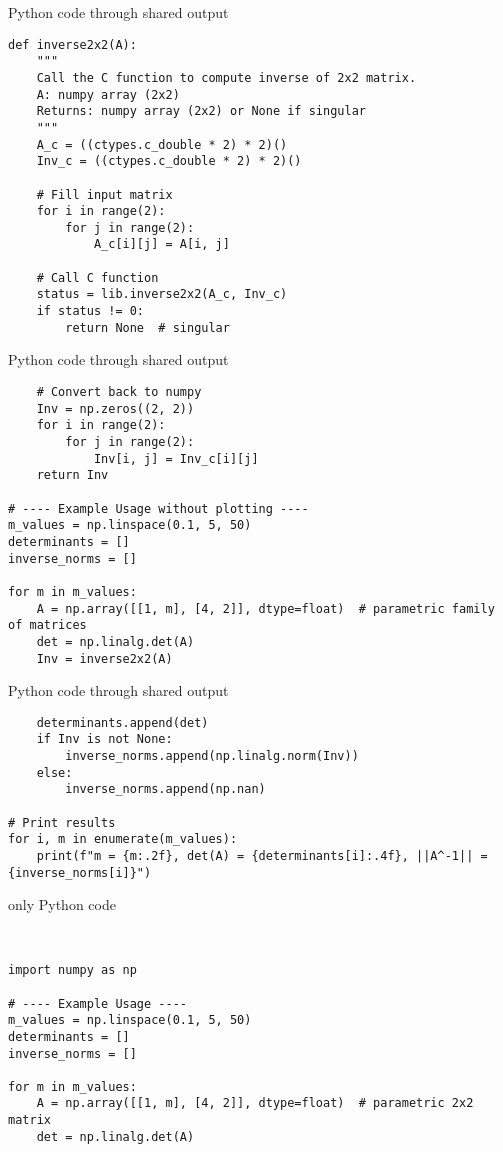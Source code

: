 \documentclass{beamer}
\begin{document}
\begin{frame}[fragile]{Python code through shared output}
\begin{lstlisting}
def inverse2x2(A):
    """
    Call the C function to compute inverse of 2x2 matrix.
    A: numpy array (2x2)
    Returns: numpy array (2x2) or None if singular
    """
    A_c = ((ctypes.c_double * 2) * 2)()
    Inv_c = ((ctypes.c_double * 2) * 2)()

    # Fill input matrix
    for i in range(2):
        for j in range(2):
            A_c[i][j] = A[i, j]

    # Call C function
    status = lib.inverse2x2(A_c, Inv_c)
    if status != 0:
        return None  # singular
 \end{lstlisting}
\end{frame}
\begin{frame}[fragile]{Python code through shared output}
\begin{lstlisting}
    # Convert back to numpy
    Inv = np.zeros((2, 2))
    for i in range(2):
        for j in range(2):
            Inv[i, j] = Inv_c[i][j]
    return Inv

# ---- Example Usage without plotting ----
m_values = np.linspace(0.1, 5, 50)
determinants = []
inverse_norms = []

for m in m_values:
    A = np.array([[1, m], [4, 2]], dtype=float)  # parametric family of matrices
    det = np.linalg.det(A)
    Inv = inverse2x2(A)
 \end{lstlisting}
\end{frame}
\begin{frame}[fragile]{Python code through shared output}
\begin{lstlisting}
    determinants.append(det)
    if Inv is not None:
        inverse_norms.append(np.linalg.norm(Inv))
    else:
        inverse_norms.append(np.nan)

# Print results
for i, m in enumerate(m_values):
    print(f"m = {m:.2f}, det(A) = {determinants[i]:.4f}, ||A^-1|| = {inverse_norms[i]}")

 \end{lstlisting}
\end{frame}

\begin{frame}[fragile]{only Python code }
\begin{lstlisting}


import numpy as np

# ---- Example Usage ----
m_values = np.linspace(0.1, 5, 50)
determinants = []
inverse_norms = []

for m in m_values:
    A = np.array([[1, m], [4, 2]], dtype=float)  # parametric 2x2 matrix
    det = np.linalg.det(A)

 \end{lstlisting}
\end{frame}
\end{document}
